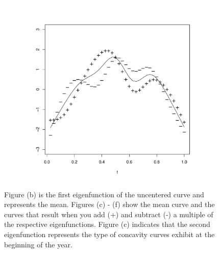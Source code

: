 \begin{figure}
	\begin{subfigure}
		[b]{0.32 
		\textwidth} \centering 
		\includegraphics[width=0.99 
		\textwidth]{Images-future-work/ef5pn.pdf} \caption{} \label{} 
	\end{subfigure}
	\caption{Figure (b) is the first eigenfunction of the uncentered curve and represents the mean. Figures (c) - (f) show the mean curve and the curves that result when you add (+) and subtract (-) a multiple of the respective eigenfunctions. Figure (c) indicates that the second eigenfunction represents the type of concavity curves exhibit at the beginning of the year.} \label{fig:interpreting eigenfunctions} 
\end{figure}
